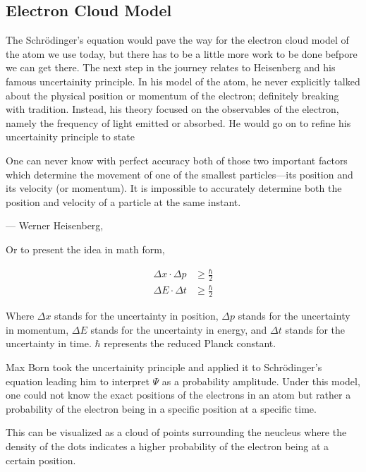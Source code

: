 \subsection{Electron Cloud Model}

The Schrödinger's equation would pave the way for the electron cloud model of the atom we use today, but there has to be a little more work to be done befpore we can get there.
The next step in the journey relates to Heisenberg and his famous uncertainity principle.
In his model of the atom, he  never explicitly talked about the physical position or momentum of the electron; definitely breaking with tradition. Instead, his theory focused on the observables of the electron, namely the frequency of light emitted or absorbed. He would go on to refine his uncertainity principle to state

One can never know with perfect accuracy both of those two important factors which determine the movement of one of the smallest particles—its position and its velocity (or momentum). It is impossible to accurately determine both the position and velocity of a particle at the same instant.

\begin{flushright}--- Werner Heisenberg,\end{flushright}

Or to present the idea in math form,

\begin{align}
  \Delta x \cdot \Delta p &\geq \frac{\hbar}{2} \\
  \Delta E \cdot \Delta t &\geq \frac{\hbar}{2}
\end{align}

Where $\Delta x$ stands for the uncertainty in position, $\Delta p$ stands for the uncertainty in momentum, $\Delta E$ stands for the uncertainty in energy, and $\Delta t$ stands for the uncertainty in time. $\hbar$ represents the reduced Planck constant.

Max Born took the uncertainity principle and applied it to Schrödinger's equation leading him to interpret $\Psi$ as a probability amplitude. Under this model, one could not know the exact positions of the electrons in an atom but rather a probability of the electron being in a specific position at a specific time.

This can be visualized as a cloud of points surrounding the neucleus where the density of the dots indicates a higher probability of the electron being at a certain position.

